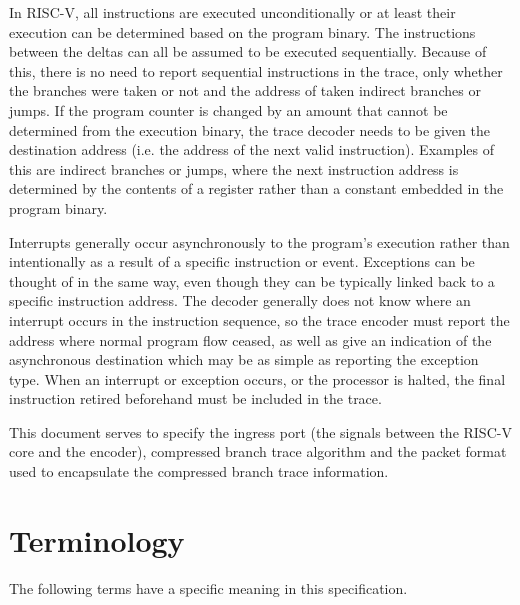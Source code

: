 In RISC-V, all instructions are executed unconditionally or at least
their execution can be determined based on the program binary. The
instructions between the deltas can all be assumed to be executed
sequentially. Because of this, there is no need to report sequential 
instructions in the trace, only whether the branches were taken or not
and the address of taken indirect branches or jumps. If the program
counter is changed by an amount that cannot be determined from the
execution binary, the trace decoder needs to be given the destination
address (i.e. the address of the next valid instruction).  Examples of
this are indirect branches or jumps, where the next instruction
address is determined by the contents of a register rather than a
constant embedded in the program binary.

Interrupts generally occur asynchronously to the program's execution
rather than intentionally as a result of a specific instruction or
event.  Exceptions can be thought of in the same way, even though they
can be typically linked back to a specific instruction address.  The
decoder generally does not know where an interrupt occurs in the
instruction sequence, so the trace encoder must report the address
where normal program flow ceased, as well as give an indication of the
asynchronous destination which may be as simple as reporting the
exception type.  When an interrupt or exception occurs, or the
processor is halted, the final instruction retired beforehand must be
included in the trace.

This document serves to specify the ingress port (the signals between
the RISC-V core and the encoder), compressed branch trace algorithm and
the packet format used to encapsulate the compressed branch trace
information.

\section{Terminology} \label{sec:terminology}

The following terms have a specific meaning in this specification.

